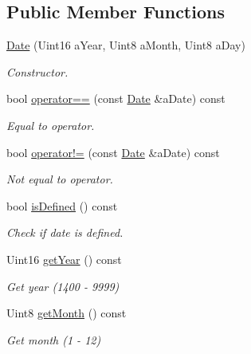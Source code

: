 \subsection*{Public Member Functions}
\begin{DoxyCompactItemize}
\item 
\hyperlink{classlibrary_1_1physics_1_1time_1_1_date_a08e7d804b40b1bfaacbccd32cf79f292}{Date} (Uint16 a\+Year, Uint8 a\+Month, Uint8 a\+Day)
\begin{DoxyCompactList}\small\item\em Constructor. \end{DoxyCompactList}\item 
bool \hyperlink{classlibrary_1_1physics_1_1time_1_1_date_a7a9c09059b4a55e857fac908a52a2451}{operator==} (const \hyperlink{classlibrary_1_1physics_1_1time_1_1_date}{Date} \&a\+Date) const
\begin{DoxyCompactList}\small\item\em Equal to operator. \end{DoxyCompactList}\item 
bool \hyperlink{classlibrary_1_1physics_1_1time_1_1_date_aaea5c9cb4cd6fd707f86008320533a2d}{operator!=} (const \hyperlink{classlibrary_1_1physics_1_1time_1_1_date}{Date} \&a\+Date) const
\begin{DoxyCompactList}\small\item\em Not equal to operator. \end{DoxyCompactList}\item 
bool \hyperlink{classlibrary_1_1physics_1_1time_1_1_date_a6cb09f728690f73d9e20c1de3f402a74}{is\+Defined} () const
\begin{DoxyCompactList}\small\item\em Check if date is defined. \end{DoxyCompactList}\item 
Uint16 \hyperlink{classlibrary_1_1physics_1_1time_1_1_date_a1f1d2de0be0baa9fbc5909a3de16a697}{get\+Year} () const
\begin{DoxyCompactList}\small\item\em Get year (1400 -\/ 9999) \end{DoxyCompactList}\item 
Uint8 \hyperlink{classlibrary_1_1physics_1_1time_1_1_date_abcf26ccf0ac9546d771efed06dc1e347}{get\+Month} () const
\begin{DoxyCompactList}\small\item\em Get month (1 -\/ 12) \end{DoxyCompactList}\item 

\end{DoxyCompactItemize}
